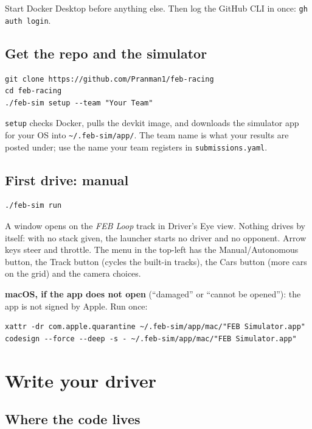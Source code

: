 \documentclass[11pt,a4paper]{article}
\newcommand{\file}[1]{\texttt{#1}}
\newcommand{\cmd}[1]{\texttt{#1}}
\begin{document}
\medskip
Start Docker Desktop before anything else. Then log the GitHub CLI in once: \cmd{gh auth login}.

\subsection{Get the repo and the simulator}

\begin{lstlisting}
git clone https://github.com/Pranman1/feb-racing
cd feb-racing
./feb-sim setup --team "Your Team"
\end{lstlisting}

\cmd{setup} checks Docker, pulls the devkit image, and downloads the simulator app for your
OS into \file{\textasciitilde/.feb-sim/app/}. The team name is what your results are posted under;
use the name your team registers in \file{submissions.yaml}.

\subsection{First drive: manual}

\begin{lstlisting}
./feb-sim run
\end{lstlisting}

A window opens on the \emph{FEB Loop} track in Driver's Eye view. Nothing drives by itself:
with no stack given, the launcher starts no driver and no opponent. Arrow keys steer and
throttle. The menu in the top-left has the Manual/Autonomous button, the Track button (cycles
the built-in tracks), the Cars button (more cars on the grid) and the camera choices.

\medskip
\textbf{macOS, if the app does not open} (``damaged'' or ``cannot be opened''): the app is not
signed by Apple. Run once:
\begin{lstlisting}
xattr -dr com.apple.quarantine ~/.feb-sim/app/mac/"FEB Simulator.app"
codesign --force --deep -s - ~/.feb-sim/app/mac/"FEB Simulator.app"
\end{lstlisting}

\section{Write your driver}

\subsection{Where the code lives}
\end{document}

